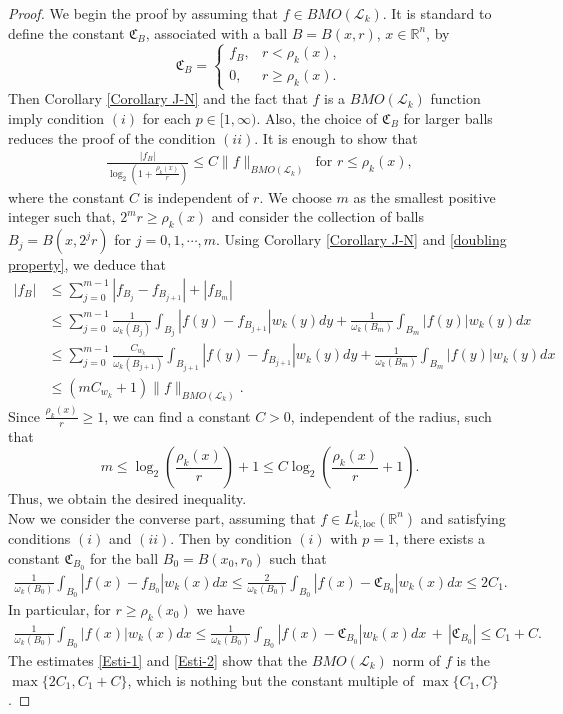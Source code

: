 \documentclass[11pt, reqno]{amsproc}
\theoremstyle{definition}
\theoremstyle{remark}
\numberwithin{equation}{section}
\begin{document}
\begin{proof}
    We begin the proof by assuming that $f\in BMO(\mathcal{L}_k)$. It is standard to define the constant $\mathfrak{C}_B$, associated with a ball $B = B(x,r)$, $x \in \mathbb{R}^n$, by
\[
\mathfrak{C}_B =
\begin{cases}
f_B, & r < \rho_k(x),\\
0, & r \geq \rho_k(x).
\end{cases}
\] 
Then Corollary \ref{Corollary J-N} and the fact that $f$ is a $BMO(\mathcal{L}_k)$ function imply condition $(i)$ for each $p\in [1,\infty)$. Also, the choice of $\mathfrak{C}_B$ for larger balls reduces the proof of the condition $(ii)$. It is enough to show that 
\begin{align*}
    \frac{|f_B|}{\log_2 \left(1+ \frac{{\rho_k}(x)}{r} \right)} \leq C\|f\|_{BMO(\mathcal{L}_k)} \, \text{ for } r \leq {\rho_k}(x),
\end{align*} where the constant $C$ is independent of $r$.
We choose $m$ as the smallest positive integer such that, $2^{m}r \geq {\rho_k}(x)$ and consider the collection of balls $B_j=B(x, 2^jr)$ for $j=0,1,\cdots, m$. Using Corollary \ref{Corollary J-N} and \eqref{doubling property}, we deduce that
\begin{align*}
    |f_B|  & \leq \sum_{j=0}^{m-1} |f_{B_j}-f_{B_{j+1}}|+|f_{B_m}|\\
    & \leq \sum_{j=0}^{m-1} \frac{1}{\omega_k(B_j)} \int_{B_j}|f(y)-f_{B_{j+1}}|w_k(y)dy + \frac{1}{\omega_k(B_m)} \int_{B_m}|f(y)|w_k(y)dx\\
    & \leq \sum_{j=0}^{m-1}  \frac{C_{w_k}}{\omega_k(B_{j+1})} \int_{B_{j+1}}|f(y)-f_{B_{j+1}}|w_k(y)dy + \frac{1}{\omega_k(B_m)} \int_{B_m}|f(y)|w_k(y)dx\\ 
    & \leq \left( mC_{w_k}+1 \right)\|f\|_{BMO(\mathcal{L}_k)}.
\end{align*} 
Since $\frac{\rho_k(x)}{r} \geq 1$, we can find a constant $C>0$, independent of the radius, such that
\[
m \leq \log_2\left( \frac{\rho_k(x)}{r} \right) + 1 \leq C \log_2\left( \frac{\rho_k(x)}{r} + 1 \right).
\]
Thus, we obtain the desired inequality.\\

Now we consider the converse part, assuming that  $f \in L_{k,\text{loc}}^1(\mathbb{R}^n)$ and satisfying conditions $(i)$ and $(ii)$.  Then by condition $(i)$ with $p=1$, there exists a constant $\mathfrak{C}_{B_0}$ for the ball $B_0=B(x_0,r_0)$ such that
\begin{align}\label{Esti-1}
    \frac{1}{\omega_k(B_0)} \int_{B_0} |f(x)-f_{B_0}| w_k(x)dx \leq  \frac{2}{\omega_k(B_0)} \int_{B_0} |f(x)-\mathfrak{C}_{B_0}| w_k(x)dx \leq 2C_1.
\end{align}
In particular, for $r\geq{\rho_k}(x_0)$ we have
\begin{align}\label{Esti-2}
    \frac{1}{\omega_k(B_0)} \int_{B_0} |f(x)| w_k(x)dx \leq   \frac{1}{\omega_k(B_0)} \int_{B_0} |f(x)-\mathfrak{C}_{B_0}| w_k(x)dx \, +\,  |\mathfrak{C}_{B_0}| \leq C_1+ C.
\end{align}
The estimates \eqref{Esti-1} and \eqref{Esti-2} show that the $BMO(\mathcal{L}_k)$ norm of $f$ is the $\max\{2C_1, C_1+ C \}$, which is nothing but the constant multiple of $\max\{C_1, C \}$. 
\end{proof}
\end{document}
